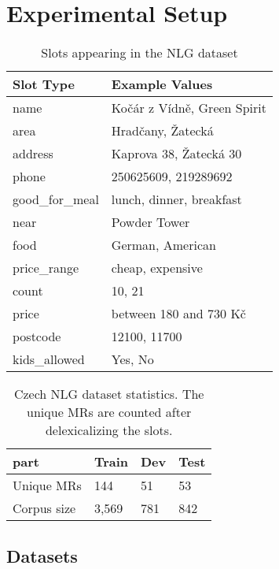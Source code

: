 \documentclass[11pt,a4paper]{article}
\begin{document}
\section{Experimental Setup}

\begin{table}[]
\begin{tabular}{l|l}
\hline
Slot Type & Example Values         \\ 
\hline
name               & Kočár z Vídně, Green Spirit     \\ 
area               & Hradčany, Žatecká               \\ 
address            & Kaprova 38, Žatecká 30          \\ 
phone              & 250625609, 219289692            \\ 
good\_for\_meal    & lunch, dinner, breakfast        \\ 
near               & Powder Tower                    \\ 
food               & German, American                \\ 
price\_range       & cheap, expensive                \\ 
count              & 10, 21                          \\ 
price              & between 180 and 730 Kč \\ 
postcode           & 12100, 11700                    \\ 
kids\_allowed           & Yes, No                    \\ 
\hline
\end{tabular}
\caption{Slots appearing in the NLG dataset}
\label{dataset-slots}
\end{table}

\begin{table}[]
\centering
\begin{tabular}{l|l|l|l}
\hline
part                      & Train & Dev & Test \\ \hline
Unique MRs  & 144   & 51  & 53   \\
Corpus size & 3,569 & 781 & 842  \\ \hline
\end{tabular}
\caption{Czech NLG dataset statistics. The unique MRs are counted after delexicalizing the slots.}
\label{dataset-stats}
\end{table}

\subsection{Datasets}
\end{document}
